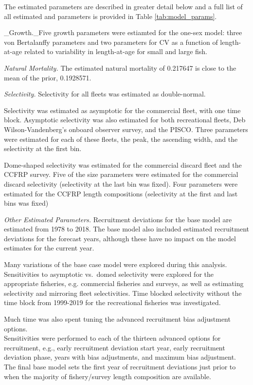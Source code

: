 \documentclass[12pt,]{article}
\begin{document}
The estimated parameters are described in greater detail below and a
full list of all estimated and parameters is provided in Table
\ref{tab:model_params}.

\_Growth.\_Five growth parameters were estiamted for the one-sex model:
three von Bertalanffy parameters and two parameters for CV as a function
of length-at-age related to variability in length-at-age for small and
large fish.

\emph{Natural Mortality.} The estimated natural mortality of 0.217647 is
close to the mean of the prior, 0.1928571.

\emph{Selectivity.} Selectivity for all fleets was estimated as
double-normal.

Selectivity was estimated as asymptotic for the commercial fleet, with
one time block. Asymptotic selectivity was also estimated for both
recreational fleets, Deb Wilson-Vandenberg's onboard observer survey,
and the PISCO. Three parameters were estimated for each of these fleets,
the peak, the ascending width, and the selectivity at the first bin.

Dome-shaped selectivity was estimated for the commercial discard fleet
and the CCFRP survey. Five of the size parameters were estimated for the
commercial discard selectivity (selectivity at the last bin was fixed).
Four parameters were estimated for the CCFRP length compositions
(selectivity at the first and last bins was fixed)

\emph{Other Estimated Parameters.} Recruitment deviations for the base
model are estimated from 1978 to 2018. The base model also included
estimated recruitment deviations for the forecast years, although these
have no impact on the model estimates for the current year.

Many variations of the base case model were explored during this
analysis. Sensitivities to asymptotic vs.~domed selectivity were
explored for the appropriate fisheries, e.g. commercial fisheries and
surveys, as well as estimating selectivity and mirroring fleet
selectivities. Time blocked selectivity without the time block from
1999-2019 for the recreational fisheries was investigated.

Much time was also spent tuning the advanced recruitment bias adjustment
options.\\
Sensitivities were performed to each of the thirteen advanced options
for recruitment, e.g., early recruitment deviation start year, early
recruitment deviation phase, years with bias adjustments, and maximum
bias adjustment. The final base model sets the first year of recruitment
deviations just prior to when the majority of fishery/survey length
composition are available.
\end{document}
